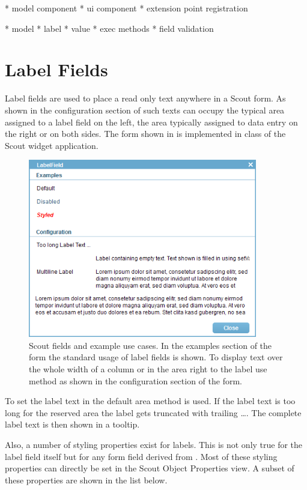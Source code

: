 \documentclass[a4paper,10pt,twoside]{book}
\begin{document}
* model component
* ui component
* extension point registration

* model
* label
* value
* exec methods
* field validation


\section{Label Fields}

Label fields are used to place a read only text anywhere in a Scout form. 
As shown in the configuration section of  such texts can occupy the typical area assigned to a label field on the left, the area typically assigned to data entry on the right or on both sides.
The form shown in  is implemented in class  of the Scout widget application.

\begin{figure}
\includegraphics[width=10cm]{labelfield.png}
\caption{Scout fields and example use cases. 
In the examples section of the form the standard usage of label fields is shown.
To display text over the whole width of a column or in the area right to the label use method  as shown in the configuration section of the form.}
\end{figure}

To set the label text in the default area method  is used. 
If the label text is too long for the reserved area the label gets truncated with trailing \dots.
The complete label text is then shown in a tooltip.

Also, a number of  styling properties exist for labels.
This is not only true for the label field itself but for any form field derived from .
Most of these styling properties can directly be set in the Scout Object Properties view.
A subset of these properties are shown in the list below.
\end{document}
